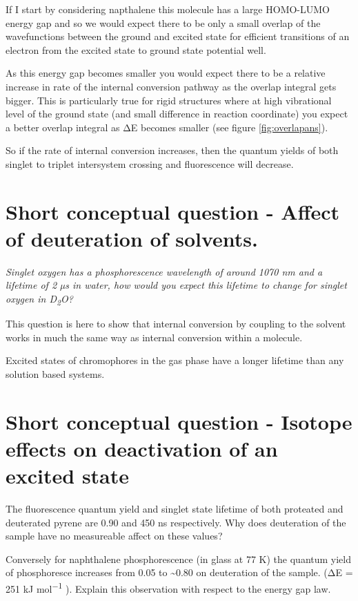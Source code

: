 \documentclass[
]{book}
\begin{document}
If I start by considering napthalene this molecule has a large HOMO-LUMO energy gap and so we would expect there to be only a small overlap of the wavefunctions between the ground and excited state for efficient transitions of an electron from the excited state to ground state potential well.

As this energy gap becomes smaller you would expect there to be a relative increase in rate of the internal conversion pathway as the overlap integral gets bigger. This is particularly true for rigid structures where at high vibrational level of the ground state (and small difference in reaction coordinate) you expect a better overlap integral as ΔE becomes smaller (see figure \ref{fig:overlapans}).

So if the rate of internal conversion increases, then the quantum yields of both singlet to triplet intersystem crossing and fluorescence will decrease.

\hypertarget{sec:dsolvent}{%
\section{Short conceptual question - Affect of deuteration of solvents.}\label{sec:dsolvent}}

\emph{Singlet oxygen has a phosphorescence wavelength of around 1070 nm and a lifetime of 2 µs in water, how would you expect this lifetime to change for singlet oxygen in D\textsubscript{2}O?}

This question is here to show that internal conversion by coupling to the solvent works in much the same way as internal conversion within a molecule.

Excited states of chromophores in the gas phase have a longer lifetime than any solution based systems.

\hypertarget{sec:isotope}{%
\section{Short conceptual question - Isotope effects on deactivation of an excited state}\label{sec:isotope}}

The fluorescence quantum yield and singlet state lifetime of both proteated and deuterated pyrene are 0.90 and 450 ns respectively. Why does deuteration of the sample have no measureable affect on these values?

Conversely for naphthalene phosphorescence (in glass at 77 K) the quantum yield of phosphoresce increases from 0.05 to \textasciitilde0.80 on deuteration of the sample. (ΔE = 251 kJ mol\textsuperscript{−1} ). Explain this observation with respect to the energy gap law.
\end{document}
